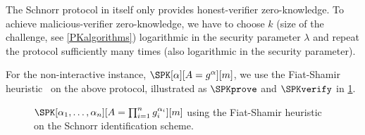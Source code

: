 The Schnorr protocol in itself only provides honest-verifier zero-knowledge.
To achieve malicious-verifier zero-knowledge, we have to choose \(k\) (size of 
the challenge, see \cref{PKalgorithms}) logarithmic in the security parameter 
\(\lambda\) and repeat the protocol sufficiently many times (also logarithmic in 
the security parameter).

For the non-interactive instance, \(\SPK[\alpha][A = g^\alpha][m]\), we use the 
Fiat-Shamir heuristic~\cite{FiatShamirHeuristic} on the above protocol, 
illustrated as \(\SPKprove\) and \(\SPKverify\) in \cref{SPKalgorithms}.

\begin{figure}
  \small
  \begin{algorithmic}
      \EndFor{}
    \EndFunction{}
  \end{algorithmic}

  \begin{algorithmic}
        \State{\Return{$\top$}}
      \EndIf{}
      \State{\Return{$\bot$}}
    \EndFunction{}
  \end{algorithmic}
  \caption{%
    \(\SPK[\alpha_1, \dotsc, \alpha_n][A = \prod_{i=1}^n g_i^{\alpha_i}][m]\) 
    using the Fiat-Shamir heuristic on the Schnorr identification scheme.
  }%
  \label{SPKalgorithms}
\end{figure}

